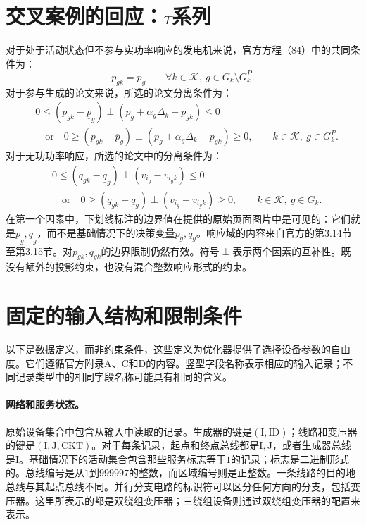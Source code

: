 \documentclass{article}
\begin{document}
\section*{交叉案例的回应：$\tau$系列}
对于处于活动状态但不参与实功率响应的发电机来说，官方方程（84）中的共同条件为：
\[
p_{gk}=p_g\qquad\forall k\in\mathcal K,\ g\in G_k\setminus G_k^P.
\]
对于参与生成的论文来说，所选的论文分离条件为：
\begin{equation}\tag{2.6}
\begin{aligned}
&0\leq(p_{gk}-\underline p_g)\perp(p_g+\alpha_g\Delta_k-p_{gk})\leq0\\
&\quad\text{or}\quad
0\geq(p_{gk}-\overline p_g)\perp(p_g+\alpha_g\Delta_k-p_{gk})\geq0,
\qquad k\in\mathcal K,\ g\in G_k^P.
\end{aligned}
\end{equation}
对于无功功率响应，所选的论文中的分离条件为：
\begin{equation}\tag{2.7}
\begin{aligned}
&0\leq(q_{gk}-\underline q_g)\perp(v_{i_g}-v_{i_g k})\leq0\\
&\quad\text{or}\quad
0\geq(q_{gk}-\overline q_g)\perp(v_{i_g}-v_{i_g k})\geq0,
\qquad k\in\mathcal K,\ g\in G_k.
\end{aligned}
\end{equation}
在第一个因素中，下划线标注的边界值在提供的原始页面图片中是可见的：它们就是$\underline p_g,\underline q_g$，而不是基础情况下的决策变量$p_g,q_g$。响应域的内容来自官方的第3.14节至第3.15节。对$p_{gk},q_{gk}$的边界限制仍然有效。符号$\perp$表示两个因素的互补性。既没有额外的投影约束，也没有混合整数响应形式的约束。

\section*{固定的输入结构和限制条件}
以下是数据定义，而非约束条件，这些定义为优化器提供了选择设备参数的自由度。它们遵循官方附录A、C和D的内容。竖型字段名称表示相应的输入记录；不同记录类型中的相同字段名称可能具有相同的含义。

\paragraph{网络和服务状态。}
原始设备集合中包含从输入中读取的记录。生成器的键是$(\mathrm I,\mathrm{ID})$；线路和变压器的键是$(\mathrm I,\mathrm J,\mathrm{CKT})$。对于每条记录，起点和终点总线都是$\mathrm I,\mathrm J$，或者生成器总线是$\mathrm I$。基础情况下的活动集合包含那些服务标志等于$1$的记录；标志是二进制形式的。总线编号是从$1$到$999997$的整数，而区域编号则是正整数。一条线路的目的地总线与其起点总线不同。并行分支电路的标识符可以区分任何方向的分支，包括变压器。这里所表示的都是双绕组变压器；三绕组设备则通过双绕组变压器的配置来表示。
\end{document}
